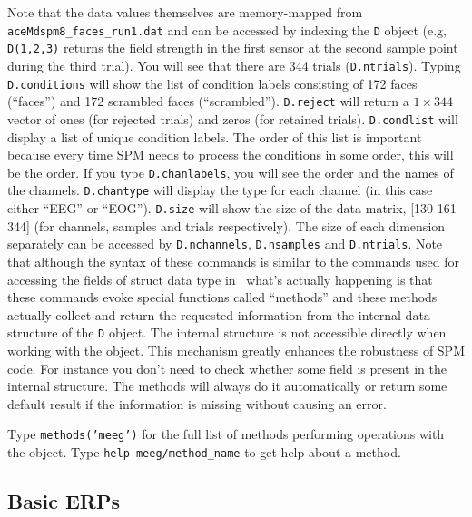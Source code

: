 Note that the data values themselves are memory-mapped from \verb!aceMdspm8_faces_run1.dat! and can be accessed by indexing the \texttt{D} object (e.g, \texttt{D(1,2,3)} returns the field strength in the first sensor at the second sample point during the third trial). You will see that there are 344 trials (\texttt{D.ntrials}). Typing \texttt{D.conditions} will show the list of condition labels consisting of 172 faces (``faces'') and 172 scrambled faces (``scrambled''). \texttt{D.reject} will return a $1\times 344$ vector of ones (for rejected trials) and zeros (for retained trials). \texttt{D.condlist} will display a list of unique condition labels. The order of this list is important because every time SPM needs to process the conditions in some order, this will be the order. If you type \texttt{D.chanlabels}, you will see the order and the names of the channels. \texttt{D.chantype} will display the type for each channel (in this case either ``EEG'' or ``EOG''). \texttt{D.size} will show the size of the data matrix, [130 161 344] (for channels, samples and trials respectively). The size of each dimension separately can be accessed by \texttt{D.nchannels}, \texttt{D.nsamples} and \texttt{D.ntrials}. Note that although the syntax of these commands is similar to the commands used for accessing the fields of struct data type in \matlab\ what's actually happening is that these commands evoke special functions called ``methods'' and these methods actually collect and return the requested information from the internal data structure of the \texttt{D} object. The internal structure is not accessible directly when working with the object. This mechanism greatly enhances the robustness of SPM code. For instance you don't need to check whether some field is present in the internal structure. The methods will always do it automatically or return some default result if the information is missing without causing an error.

Type \texttt{methods('meeg')} for the full list of methods performing operations with the object. Type \texttt{help meeg/method\_name} to get help about a method.


\subsection{Basic ERPs}

